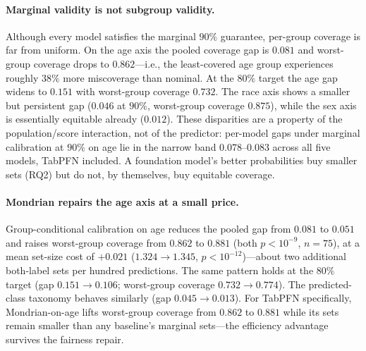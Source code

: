 \documentclass[review,12pt]{elsarticle}
\begin{document}
\paragraph{Marginal validity is not subgroup validity.}
Although every model satisfies the marginal $90\%$ guarantee, per-group coverage is far from uniform. On the age axis the pooled coverage gap is $0.081$ and worst-group coverage drops to $0.862$---i.e., the least-covered age group experiences roughly $38\%$ more miscoverage than nominal. At the $80\%$ target the age gap widens to $0.151$ with worst-group coverage $0.732$. The race axis shows a smaller but persistent gap ($0.046$ at $90\%$, worst-group coverage $0.875$), while the sex axis is essentially equitable already ($0.012$). These disparities are a property of the population/score interaction, not of the predictor: per-model gaps under marginal calibration at $90\%$ on age lie in the narrow band $0.078$--$0.083$ across all five models, TabPFN included. A foundation model's better probabilities buy smaller sets (RQ2) but do not, by themselves, buy equitable coverage.

\paragraph{Mondrian repairs the age axis at a small price.}
Group-conditional calibration on age reduces the pooled gap from $0.081$ to $0.051$ and raises worst-group coverage from $0.862$ to $0.881$ (both $p<10^{-9}$, $n=75$), at a mean set-size cost of $+0.021$ ($1.324 \to 1.345$, $p<10^{-12}$)---about two additional both-label sets per hundred predictions. The same pattern holds at the $80\%$ target (gap $0.151 \to 0.106$; worst-group coverage $0.732 \to 0.774$). The predicted-class taxonomy behaves similarly (gap $0.045 \to 0.013$). For TabPFN specifically, Mondrian-on-age lifts worst-group coverage from $0.862$ to $0.881$ while its sets remain smaller than any baseline's marginal sets---the efficiency advantage survives the fairness repair.
\end{document}
